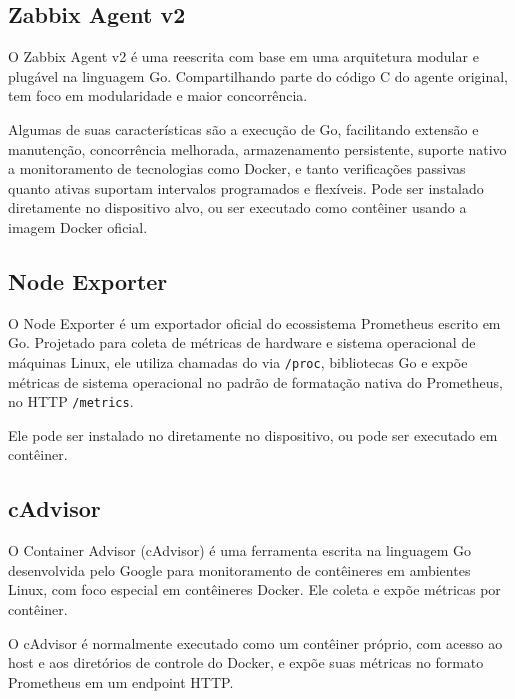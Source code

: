 \subsection{Zabbix Agent v2}
\label{subsection:ZabbixAgentV2}

O Zabbix Agent v2 \citep{zabbix2025} é uma reescrita com base em uma arquitetura modular e plugável na linguagem Go. Compartilhando parte do código C do agente original, tem foco em modularidade e maior concorrência.

Algumas de suas características são a execução de  Go, facilitando extensão e manutenção, concorrência melhorada, armazenamento persistente, suporte nativo a monitoramento de tecnologias como Docker, e tanto verificações passivas quanto ativas suportam intervalos programados e flexíveis. Pode ser instalado diretamente no dispositivo alvo, ou ser executado como contêiner usando a imagem Docker oficial.

\subsection{Node Exporter}
\label{subsection:NodeExporter}

O Node Exporter \citep{nodeexporter2025} é um exportador oficial do ecossistema Prometheus escrito em Go. Projetado para coleta de métricas de hardware e sistema operacional de máquinas Linux, ele utiliza chamadas do  via \verb|/proc|, bibliotecas Go e expõe métricas de sistema operacional no padrão de formatação nativa do Prometheus, no  HTTP \verb|/metrics|.

Ele pode ser instalado no diretamente no dispositivo, ou pode ser executado em contêiner. 

\subsection{cAdvisor}
\label{subsection:cAdvisor}

O Container Advisor (cAdvisor) \citep{cadvisor2025} é uma ferramenta escrita na linguagem Go desenvolvida pelo Google para monitoramento de contêineres em ambientes Linux, com foco especial em contêineres Docker. Ele coleta e expõe métricas por contêiner.

O cAdvisor é normalmente executado como um contêiner próprio, com acesso ao host e aos diretórios de controle do Docker, e expõe suas métricas no formato Prometheus em um endpoint HTTP.

